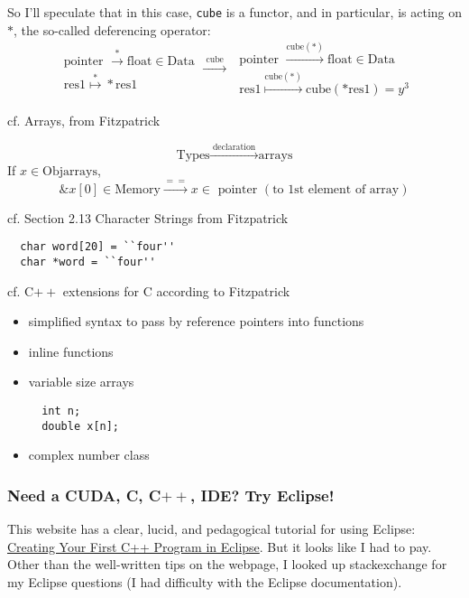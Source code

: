 \documentclass[10pt]{amsart}
\begin{document}
\begin{multicols*}{2}
So I'll speculate that in this case, \verb|cube| is a functor, and in particular, is acting on $*$, the so-called deferencing operator:
\[
\begin{gathered}
  \text{ pointer } \xrightarrow{ * } \text{float} \in \text{Data} \\
  \text{ res}1 \overset{*}{\mapsto} *\text{res}1
\end{gathered} \xrightarrow{ \text{ cube } } \begin{gathered}
  \text{ pointer } \xrightarrow{ \text{cube}(*) } \text{float} \in \text{Data} \\
  \text{ res}1 \overset{\text{cube}(*)}{\mapsto} \text{cube}(*\text{res}1)=y^3
\end{gathered}
\]

cf.  Arrays, from Fitzpatrick \cite{Fitz}

\[
\text{Types} \xrightarrow{ \text{ declaration } } \text{arrays}
\]
If $x\in \text{Obj}\text{arrays}$,
\[
\& x[0] \in \text{Memory} \xrightarrow{ == } x \in \text{ pointer } (\text{to 1st element of array})
\]


cf. Section 2.13 Character Strings from Fitzpatrick \cite{Fitz}

\begin{lstlisting}
  char word[20] = ``four''
  char *word = ``four''
\end{lstlisting}

cf. C$++$ extensions for C according to Fitzpatrick \cite{Fitz}
\begin{itemize}
\item simplified syntax to pass by reference pointers into functions
\item inline functions
\item variable size arrays \begin{lstlisting}
  int n;
  double x[n];
  \end{lstlisting}
\item complex number class
\end{itemize}


\subsubsection{Need a CUDA, C, C$++$, IDE?  Try Eclipse!}

This website has a clear, lucid, and pedagogical tutorial for using Eclipse: \href{https://www.fayewilliams.com/2011/06/28/creating-your-first-c-program-in-eclipse/}{	
Creating Your First C++ Program in Eclipse}.  But it looks like I had to pay.  Other than the well-written tips on the webpage, I looked up stackexchange for my Eclipse questions (I had difficulty with the Eclipse documentation).  


\end{multicols*}
\end{document}
